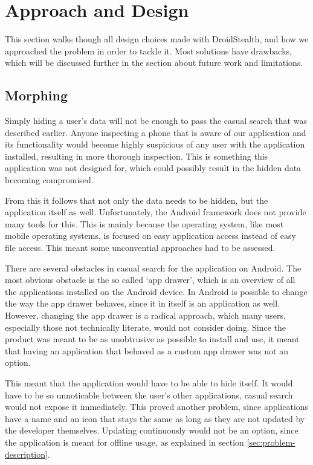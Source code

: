 \section{Approach and Design}
\label{sec:approach-and-design}
This section walks though all design choices made with DroidStealth,
and how we approached the problem in order to tackle it. Most 
solutions have drawbacks, which will be discussed further in the
section about future work and limitations. %


\subsection{Morphing}
\label{sec:approach-and-design:morphing}

Simply hiding a user's data will not be enough to pass the casual search that was described earlier. 
Anyone inspecting a phone that is aware of our application and its functionality would become highly suspicious of any user with the application installed, resulting in more thorough inspection. 
This is something this application was not designed for, which could possibly result in the hidden data becoming compromised. 

From this it follows that not only the data needs to be hidden, but the application itself as well. 
Unfortunately, the Android framework does not provide many tools for this. 
This is mainly because the operating system, like most mobile operating systems, is focused on easy application access instead of easy file access. 
This meant some unconvential approaches had to be assessed.

There are several obstacles in casual search for the application on Android. 
The most obvious obstacle is the so called `app drawer', which is an overview of all the applications installed on the Android device.
In Android is possible to change the way the app drawer behaves, since it in itself is an application as well.
However, changing the app drawer is a radical approach, which many users, especially those not technically literate, would not consider doing.
Since the product was meant to be as unobtrusive as possible to install and use, it meant that having an application that behaved as a custom app drawer was not an option.

This meant that the application would have to be able to hide itself.
It would have to be so unnoticable between the user's other applications, casual search would not expose it immediately. 
This proved another problem, since applications have a name and an icon that stays the same as long as they are not updated by the developer themselves. 
Updating continuously would not be an option, since the application is meant for offline usage, as explained in section \ref{sec:problem-description}. 

